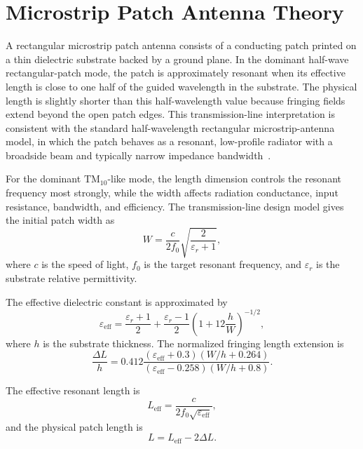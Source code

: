 \section{Microstrip Patch Antenna Theory}
\label{sec:microstrip-patch-theory}

A rectangular microstrip patch antenna consists of a conducting patch printed on a thin dielectric
substrate backed by a ground plane. In the dominant half-wave rectangular-patch mode, the patch is
approximately resonant when its effective length is close to one half of the guided wavelength in the
substrate. The physical length is slightly shorter than this half-wavelength value because fringing
fields extend beyond the open patch edges. This transmission-line interpretation is consistent with the standard half-wavelength rectangular
microstrip-antenna model, in which the patch behaves as a resonant, low-profile radiator with a
broadside beam and typically narrow impedance bandwidth~\cite{stutzman2013antenna}.

For the dominant \(\mathrm{TM}_{10}\)-like mode, the length dimension controls the resonant
frequency most strongly, while the width affects radiation conductance, input resistance, bandwidth,
and efficiency. The transmission-line design model gives the initial patch width as
\begin{equation}
W=
\frac{c}{2f_0}
\sqrt{\frac{2}{\varepsilon_r+1}},
\label{eq:patch-width}
\end{equation}
where \(c\) is the speed of light, \(f_0\) is the target resonant frequency, and \(\varepsilon_r\) is
the substrate relative permittivity.

The effective dielectric constant is approximated by
\begin{equation}
\varepsilon_{\mathrm{eff}}
=
\frac{\varepsilon_r+1}{2}
+
\frac{\varepsilon_r-1}{2}
\left(1+12\frac{h}{W}\right)^{-1/2},
\label{eq:patch-eeff}
\end{equation}
where \(h\) is the substrate thickness. The normalized fringing length extension is
\begin{equation}
\frac{\Delta L}{h}
=
0.412
\frac{(\varepsilon_{\mathrm{eff}}+0.3)(W/h+0.264)}
{(\varepsilon_{\mathrm{eff}}-0.258)(W/h+0.8)}.
\label{eq:patch-delta-l}
\end{equation}

The effective resonant length is
\begin{equation}
L_{\mathrm{eff}}=
\frac{c}{2f_0\sqrt{\varepsilon_{\mathrm{eff}}}},
\label{eq:patch-leff}
\end{equation}
and the physical patch length is
\begin{equation}
L=L_{\mathrm{eff}}-2\Delta L.
\label{eq:patch-length}
\end{equation}

